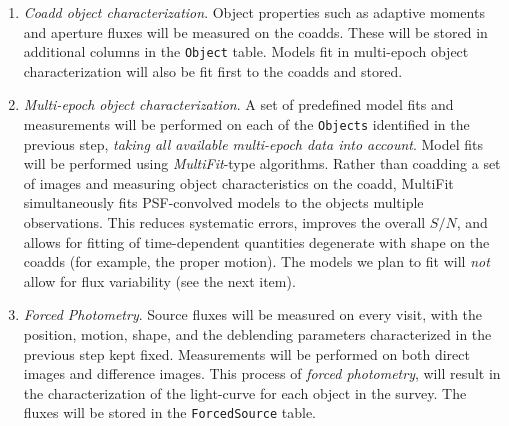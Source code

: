 \documentclass[12pt]{article}
\newcommand{\code}[1]{\texttt{#1}}
\newcommand{\Object}{\code{Object}\xspace}
\newcommand{\Objects}{\code{Objects}\xspace}
\newcommand{\Source}{\code{Source}\xspace}
\newcommand{\Sources}{\code{Sources}\xspace}
\newcommand{\ForcedSource}{\code{ForcedSource}\xspace}
\newcommand{\req}[1]{\marginpar{\tiny #1}}
\newcommand{\dmreq}[1]{\req{DMS-REQ-#1}}
\begin{document}
\begin{enumerate}
catalogs\footnote{Note that \Sources are not considered when generating the \Object list (given the large
number of visits in each band, the false positives close to the faint end would increase the complexity of
association and deblending algorithms). It is possible for intermittent sources that are detected just above
the faint detection limit of single visits to be undetected in coaddds, and thus to not have a matching \Object.
To enable easy identification of such \Sources, the nearest \Object associated with each \Source, if any, will be recorded.}.\dmreq{0034}

    The deblender will make use of all information available at this stage, including the knowledge of peak positions, bands, time, time variability (from Level 1), Galactic longitude and latitude, etc. The output of this stage is a list of uncharacterized \Objects\footnote{Depending on the exact implementation of the deblender, this stage may also attach significant metadata (eg, deblended footprints and pixel-weight maps) to each deblended \Object record.}.
    \item \emph{Coadd object characterization}.  Object properties such as adaptive moments and aperture fluxes will be measured on the coadds.  These will be stored in additional columns in the \Object table.  Models fit in multi-epoch object characterization will also be fit first to the coadds and stored. \dmreq{0276}
    \item \emph{Multi-epoch object characterization}. A set of predefined model fits and measurements will be performed on each of the \Objects identified in the previous step, \textit{taking all available multi-epoch data into account}. Model fits will be performed using \emph{MultiFit}-type algorithms. Rather than coadding a set of images and measuring object characteristics on the coadd, MultiFit simultaneously fits PSF-convolved models to the objects multiple observations. This reduces systematic errors, improves the overall $S/N$, and allows for fitting of time-dependent quantities degenerate with shape on the coadds (for example, the proper motion). The models we plan to fit will \emph{not} allow for flux variability (see the next item). \dmreq{0275}
    \item \emph{Forced Photometry}. Source fluxes will be measured on every visit, with the position, motion, shape, and the deblending parameters characterized in the previous step kept fixed.
Measurements will be performed on both direct images and difference images.
This process of \emph{forced photometry}, will result in the characterization of the light-curve for each object in the survey. The fluxes will be stored in the \ForcedSource table.\dmreq{0268}
\end{enumerate}
\end{document}
